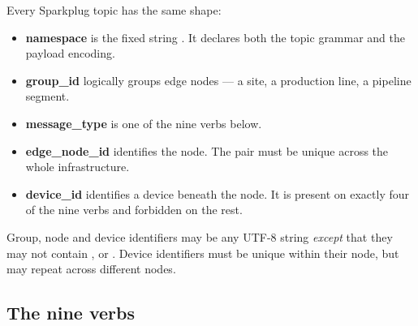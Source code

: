Every Sparkplug topic has the same shape:

\begin{center}
\end{center}

\begin{itemize}
  \item \textbf{namespace} is the fixed string . It declares both the topic
        grammar and the payload encoding.
  \item \textbf{group\_id} logically groups edge nodes --- a site, a production line, a
        pipeline segment.
  \item \textbf{message\_type} is one of the nine verbs below.
  \item \textbf{edge\_node\_id} identifies the node. The pair
         must be unique across the whole infrastructure.
  \item \textbf{device\_id} identifies a device beneath the node. It is present on exactly
        four of the nine verbs and forbidden on the rest.
\end{itemize}

Group, node and device identifiers may be any UTF-8 string \emph{except} that they may not
contain \code{+}, \code{/} or \code{\#}. Device identifiers must be unique within their
node, but may repeat across different nodes.

\subsection{The nine verbs}

